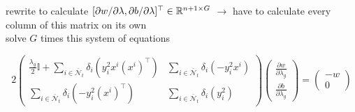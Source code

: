 	rewrite to calculate \([\partial w / \partial \lambda, \partial b / \partial \lambda]^{\top} \in \mathbb{R}^{n+1 \times G}\) \(\to\) have to calculate every column of this matrix on its own \\
	solve \(G\) times this system of equations
	
	\[ 2\begin{pmatrix} \frac{\lambda_g}{2}\mathbb{I}+\sum_{i \in  \bar{\mathcal{N}}_t}{\delta_i(y_i^2x^i(x^i)^{\top})} &  \sum_{i \in  \bar{\mathcal{N}}_t} \delta_i (- y_i^2x^i )	\\
	\sum_{i \in  \bar{\mathcal{N}}_t} \delta_i (-y_i^2(x^i)^{\top}) & \sum_{i \in  \bar{\mathcal{N}}_t} \delta_i (y_i^2 )
	\end{pmatrix} 
	\begin{pmatrix}	\frac{\partial w}{\partial \lambda_g} \\ \frac{\partial b}{\partial \lambda_g}
	\end{pmatrix} 
	= \begin{pmatrix} -w \\ 0	\end{pmatrix} \]










